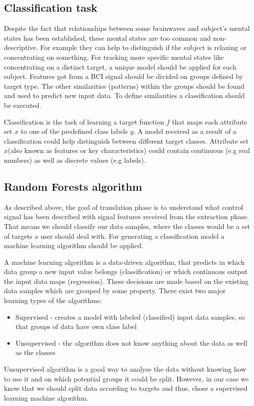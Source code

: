 \documentclass[12pt]{article}
\begin{document}
\subsection{Classification task}

Despite the fact that relationships between some brainwaves and subject's mental states has been established, these mental states are too common and non-descriptive. For example they can help to distinguish if the subject is relaxing or concentrating on something. For tracking more specific mental states like concentrating on a distinct target, a unique model should be applied for each subject. Features got from a BCI signal should be divided on groups defined by target type. The other similarities (patterns) within the groups should be found and used to predict new input data. To define similarities a classification should be executed.

Classification is the task of learning a target function $f$ that maps each attribute set $x$ to one of the predefined class labels $y$\cite{classification_basics}. A model received as a result of a classification could help distinguish between different target classes. Attribute set $x$(also known as features or key characteristics) could contain continuous (e.g real numbers) as well as discrete values (e.g labels).

\subsection{Random Forests algorithm}

As described above, the goal of translation phase is to understand what control signal has been described with signal features received from the extraction phase. That means we should classify our data samples, where the classes would be a set of targets a user should deal with. For generating a classification model a machine learning algorithm should be applied. 

A machine learning algorithm is a data-driven algorithm, that predicts in which data group a new input value belongs (classification) or which continuous output the input data maps (regression). These decisions are made based on the existing data samples which are grouped by some property. There exist two major learning types of the algorithms\cite{ml_types}:
\begin{itemize}
\item Supervised - creates a model with labeled (classified) input data samples, so that groups of data have own class label
\item Unsupervised - the algorithm does not know anything about the data as well as the classes
\end{itemize}
Unsupervised algorithm is a good way to analyse the data without knowing how to use it and on which potential groups it could be split. However, in our case we know that we should split data according to targets and thus, chose a supervised learning machine algorithm.
\end{document}
